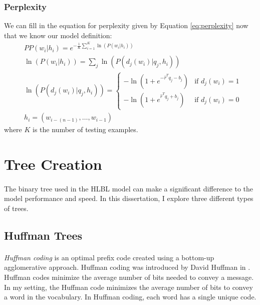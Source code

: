 \subsubsection{Perplexity}
We can fill in the equation for perplexity given by Equation \ref{eq:perplexity} now that we know our model definition:
\begin{align}
&PP(w_i | h_i)=e^{- \frac{1}{K} \sum_{i=1}^K \ln( P(w_i | h_i) ) }
\\
&\ln(P(w_i | h_i )) = \sum_j \ln(P(d_j(w_i) | q_j, h_i)) \nonumber
\\
&\ln(P(d_j(w_i) | q_j, h_i)) =  
\begin{cases}
  -\ln (1 + e^{-\hat{r}^T q_{j} -b_{j}}) & \text{if } d_j(w_i)  = 1 \\
  -\ln (1 + e^{\hat{r}^T q_{j} +b_{j}})     & \text{if } d_j(w_i) = 0
  \end{cases} \nonumber
\\
 & h_i = ( w_{i-(n-1)},\dots, w_{i-1} ) \nonumber
\end{align}
where $K$ is the number of testing examples. 


\section{Tree Creation} \label{sec:treeCreation}
\paragraph{}
The binary tree used in the HLBL model can make a significant difference to the model performance and speed. In this dissertation, I explore three different types of trees.
\subsection{Huffman Trees}
\paragraph{}
\emph{Huffman coding} is an optimal prefix code created using a bottom-up agglomerative approach. Huffman coding was introduced by David Huffman in \cite{Huffman1952}. Huffman codes minimize the average number of bits needed to convey a message. In my setting, the Huffman code minimizes the average number of bits to convey a word in the vocabulary. In Huffman coding, each word has a single unique code.
